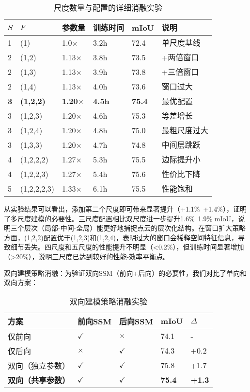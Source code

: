 \documentclass[preprint,12pt]{elsarticle}
\begin{document}
\begin{table}[htbp!]
	\centering
	\caption{尺度数量与配置的详细消融实验}
	\label{tab:scale_number}
	\begin{tabular}{@{}llllll@{}}
		\toprule
		$S$ & $F$ & 参数量 & 训练时间 & mIoU & 说明 \\ 
		\midrule
		1 & (1) & 1.0$\times$ & 3.2h & 72.4 & 单尺度基线 \\
		\midrule
		2 & (1,2) & 1.13$\times$ & 3.8h & 73.5 & +两倍窗口 \\
		2 & (1,3) & 1.13$\times$ & 3.9h & 73.8 & +三倍窗口 \\
		2 & (1,4) & 1.13$\times$ & 4.0h & 73.6 & 窗口过大 \\
		\midrule
		\textbf{3} & \textbf{(1,2,2)} & \textbf{1.20$\times$} & \textbf{4.5h} & \textbf{75.4} & 最优配置 \\
		3 & (1,2,3) & 1.20$\times$ & 4.6h & 75.3 & 等差增长 \\
		3 & (1,2,4) & 1.20$\times$ & 4.8h & 75.0 & 最粗尺度过大 \\
		3 & (1,3,3) & 1.20$\times$ & 4.7h & 74.8 & 中间层跳跃 \\
		\midrule
		4 & (1,2,2,2) & 1.27$\times$ & 5.3h & 75.5 & 边际提升小 \\
		4 & (1,2,2,3) & 1.27$\times$ & 5.4h & 75.6 & 性价比下降 \\
		5 & (1,2,2,2,3) & 1.33$\times$ & 6.1h & 75.5 & 性能饱和 \\
		\bottomrule
	\end{tabular}
\end{table}

从实验结果可以看出，添加第二个尺度即可带来显著提升（+1.1\%~+1.4\%），证明了多尺度建模的必要性。三尺度配置相比双尺度进一步提升1.6\%~1.9\% mIoU，说明三个层次（局部-中间-全局）能更好地捕捉点云的层次化结构。在窗口扩大策略方面，(1,2,2)配置优于(1,2,3)和(1,2,4)，表明过大的窗口会稀释空间特征信息，导致细节丢失。四尺度和五尺度的性能提升不明显（<0.2\%），但训练时间显著增加（>20\%），说明三尺度已达到较好的性能-效率平衡点。

双向建模策略消融：为验证双向SSM（前向+后向）的必要性，我们对比了单向和双向方案：

\begin{table}[htbp!]
	\centering
	\caption{双向建模策略消融实验}
	\label{tab:bidirectional_ablation}
	\begin{tabular}{@{}lllll@{}}
		\toprule
		方案 & 前向SSM & 后向SSM & mIoU & $\Delta$ \\ 
		\midrule
		仅前向 & $\checkmark$ & $\times$ & 74.1 & - \\
		仅后向 & $\times$ & $\checkmark$ & 74.3 & +0.2 \\
		\midrule
		双向（独立参数） & $\checkmark$ & $\checkmark$ & 75.8 & +1.7 \\
		\textbf{双向（共享参数）} & $\checkmark$ & $\checkmark$ & \textbf{75.4} & \textbf{+1.3} \\
		\bottomrule
	\end{tabular}
\end{table}
\end{document}
